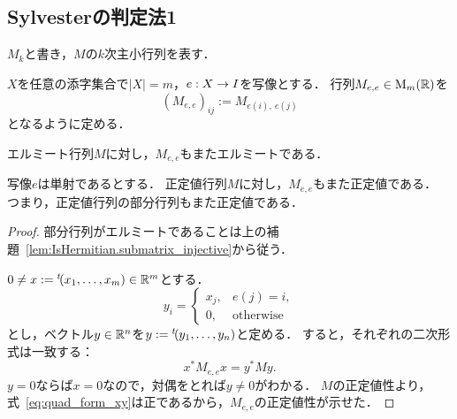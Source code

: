 \subsection{Sylvesterの判定法1}

\begin{definition}
  \label{def:Matrix.leadingSubmatrix}
  \leanok
  $M_k$と書き，$M$の$k$次主小行列を表す．
\end{definition}

$X$を任意の添字集合で$|X| = m$，$e : X \rightarrow I$を写像とする．
行列$M_{e, e} \in \operatorname{M}_m(\mathbb{R})$を
\begin{equation}
  (M_{e, e})_{ij} := M_{e(i),\ e(j)}
\end{equation}
となるように定める．

\begin{lemma}
  \label{lem:IsHermitian.submatrix_injective}
  \leanok
  エルミート行列$M$に対し，$M_{e, e}$もまたエルミートである．
\end{lemma}

\begin{lemma}
  \label{lem:PosDef.submatrix_injective}
  \leanok
  写像$e$は単射であるとする．
  正定値行列$M$に対し，$M_{e, e}$もまた正定値である．
  つまり，正定値行列の部分行列もまた正定値である．
\end{lemma}

\begin{proof}
  部分行列がエルミートであることは上の補題~\ref{lem:IsHermitian.submatrix_injective}から従う．

  $ 0 \ne x := {}^t\!(x_1, \ldots, x_m) \in \mathbb{R}^m$とする．
  \begin{equation}
    y_i = \begin{cases}
      x_j, & e(j) = i,\\
      0, & \mathrm{otherwise}
    \end{cases}
  \end{equation}
  とし，ベクトル$y \in \mathbb{R}^n$を$y := {}^t\!(y_1, \ldots, y_n)$と定める．
  すると，それぞれの二次形式は一致する：
  \begin{equation}
    x^* M_{e, e} x = y^* M y. \label{eq:quad_form_xy}
  \end{equation}
  $y = 0$ならば$x = 0$なので，対偶をとれば$y \ne 0$がわかる．
  $M$の正定値性より，式~\eqref{eq:quad_form_xy}は正であるから，$M_{e,e}$の正定値性が示せた．
\end{proof}

